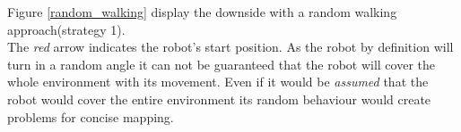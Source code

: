 Figure \ref{random_walking} display the downside with a random walking approach(strategy 1). \\
The \textit{red} arrow indicates the robot's start position. 
As the robot by definition will turn in a random angle it can not be guaranteed that the robot will cover the whole environment with its movement. Even if it would be \textit{assumed} that the robot would cover the entire environment its random behaviour would create problems for concise mapping. 
